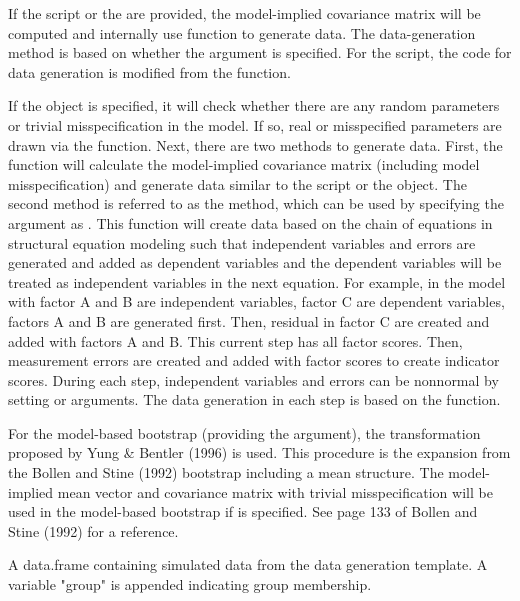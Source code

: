 \documentclass[a4paper]{book}
\begin{document}
%
\begin{Details}\relax
If the  script or the  are provided, the model-implied covariance matrix will be computed and internally use  function to generate data. The data-generation method is based on whether the  argument is specified. For the  script, the code for data generation is modified from the  function.

If the  object is specified, it will check whether there are any random parameters or trivial misspecification in the model. If so, real or misspecified parameters are drawn via the  function. Next, there are two methods to generate data. First, the function will calculate the model-implied covariance matrix (including model misspecification) and generate data similar to the  script or the  object. The second method is referred to as the  method, which can be used by specifying the  argument as . This function will create data based on the chain of equations in structural equation modeling such that independent variables and errors are generated and added as dependent variables and the dependent variables will be treated as independent variables in the next equation. For example, in the model with factor A and B are independent variables, factor C are dependent variables, factors A and B are generated first. Then, residual in factor C are created and added with factors A and B. This current step has all factor scores. Then, measurement errors are created and added with factor scores to create indicator scores. During each step, independent variables and errors can be nonnormal by setting  or  arguments. The data generation in each step is based on the  function.

For the model-based bootstrap (providing the  argument), the transformation proposed by Yung \& Bentler (1996) is used. This procedure is the expansion from the Bollen and Stine (1992) bootstrap including a mean structure. The model-implied mean vector and covariance matrix with trivial misspecification will be used in the model-based bootstrap if  is specified. See page 133 of Bollen and Stine (1992) for a reference. 
\end{Details}
%
\begin{Value}
A data.frame containing simulated data from the data generation template. A variable "group" is appended indicating group membership.
\end{Value}
\end{document}
